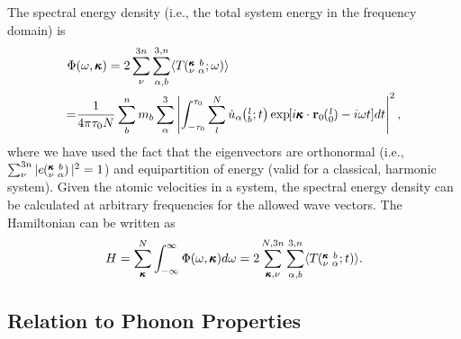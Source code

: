 \documentclass[twocolumn,10pt]{asme2e}
\newcommand{\EXP}[1]{\exp\mspace{-5.0mu}\left[#1\right]\mspace{-3.0mu}}
\newcommand{\ab}[2]{\mspace{-4.0mu}\left(\mspace{-8.0mu}\begin{smallmatrix}&\ifthenelse{\equal{#1}{}}{a}{#1} \\&\ifthenelse{\equal{#2}{}}{b}{#2}\end{smallmatrix}\mspace{-3.0mu}\right)}
\newcommand{\kvbat}{\mspace{-4.0mu}\left(\mspace{-8.0mu}\begin{smallmatrix} &\pmb{\kappa} &b \\ &\nu &\alpha\end{smallmatrix}\mspace{-2.0mu};t\right)}
\newcommand{\kvbaw}{\mspace{-4.0mu}\left(\mspace{-8.0mu}\begin{smallmatrix} &\pmb{\kappa} &b \\ &\nu &\alpha\end{smallmatrix}\mspace{-2.0mu};\omega\right)}
\newcommand{\kvba}{\mspace{-4.0mu}\left(\mspace{-8.0mu}\begin{smallmatrix} &\pmb{\kappa} &b \\ &\nu &\alpha\end{smallmatrix}\mspace{-3.0mu}\right)}
\newcommand{\lbt}{\mspace{-4.0mu}\left(\mspace{-8.0mu}\begin{smallmatrix}&l \\&b\end{smallmatrix}\mspace{-2.0mu};t\right)}
\begin{document}
The spectral energy density (i$.$e$.$, the total system energy in the frequency domain) is
\begin{equation}\label{E:SED}
\begin{split}
\Phi&(\omega,\pmb{\kappa})=2\sum_{\nu}^{3n}\sum_{\alpha,b}^{3,n}\langle T\kvbaw\rangle\\
                         =&\frac{1}{4\pi\tau_0N}\sum_b^nm_b\sum_{\alpha}^3\left|\int_{-\tau_0}^{\tau_0}\sum_l^N\dot{u}_{\alpha}\lbt\EXP{i\pmb{\kappa}\cdot\mathbf{r}_0\ab{l}{0}-i\omega t}dt\right|^2,
\end{split}
\end{equation}
where we have used the fact that the eigenvectors are orthonormal (i$.$e$.$,
$\sum_{\nu}^{3n}|e\kvba|^2=1$)\cite{dove1993} and equipartition of energy
(valid for a classical, harmonic system). Given the atomic velocities in a
system, the spectral energy density can be calculated at arbitrary
frequencies for the allowed wave vectors. The Hamiltonian can be written as
\begin{equation}\label{E:equipartition}
H=\sum_{\pmb{\kappa}}^{N}\int_{-\infty}^{\infty}\Phi(\omega,\pmb{\kappa})d\omega=2\sum_{\pmb{\kappa},\nu}^{N,3n}\sum_{\alpha,b}^{3,n}\langle T\kvbat\rangle.
\end{equation}


\subsection*{Relation to Phonon Properties}\label{S:Properties}
\end{document}
